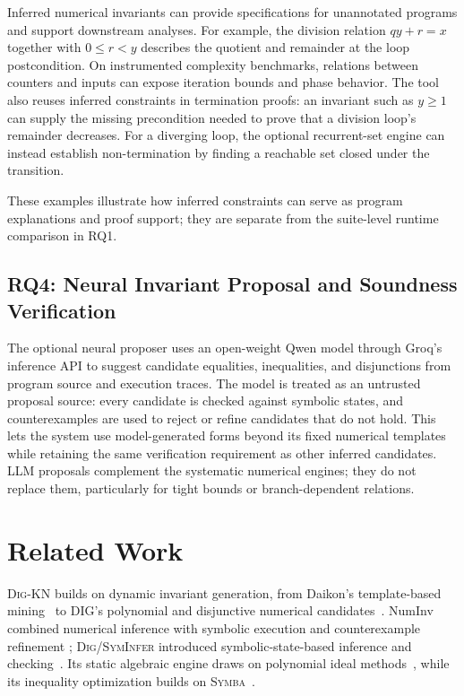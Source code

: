 \documentclass[runningheads]{llncs}
\newcommand{\tool}{\textsc{Dig-KN}\xspace}
\newcommand{\digold}{\textsc{Dig/SymInfer}\xspace}
\begin{document}
Inferred numerical invariants can provide specifications for unannotated programs and support downstream analyses. For example, the division relation $q y + r = x$ together with $0 \le r < y$ describes the quotient and remainder at the loop postcondition. On instrumented complexity benchmarks, relations between counters and inputs can expose iteration bounds and phase behavior. The tool also reuses inferred constraints in termination proofs: an invariant such as $y \ge 1$ can supply the missing precondition needed to prove that a division loop's remainder decreases. For a diverging loop, the optional recurrent-set engine can instead establish non-termination by finding a reachable set closed under the transition.

These examples illustrate how inferred constraints can serve as program explanations and proof support; they are separate from the suite-level runtime comparison in RQ1.

\subsection{RQ4: Neural Invariant Proposal and Soundness Verification}
\label{sec:rq4}

The optional neural proposer uses an open-weight Qwen model through Groq's inference API to suggest candidate equalities, inequalities, and disjunctions from program source and execution traces. The model is treated as an untrusted proposal source: every candidate is checked against symbolic states, and counterexamples are used to reject or refine candidates that do not hold. This lets the system use model-generated forms beyond its fixed numerical templates while retaining the same verification requirement as other inferred candidates. LLM proposals complement the systematic numerical engines; they do not replace them, particularly for tight bounds or branch-dependent relations.

\section{Related Work}
\label{sec:related}

\tool{} builds on dynamic invariant generation, from Daikon's template-based
mining~\cite{ernst2007daikon} to \textsc{DIG}'s polynomial and disjunctive
numerical candidates~\cite{nguyen2012dig,nguyen2014dig}. NumInv combined
numerical inference with symbolic execution and counterexample refinement
\cite{nguyen2017numinv}; \digold{} introduced symbolic-state-based inference
and checking~\cite{nguyen2021using,nguyen2017syminfer}. Its static algebraic
engine draws on polynomial ideal methods~\cite{rodriguez2007kapur,rodriguez2007simple,mullerolm2004,hrushovski2018},
while its inequality optimization builds on \textsc{Symba}~\cite{li2014symba}.
\end{document}
